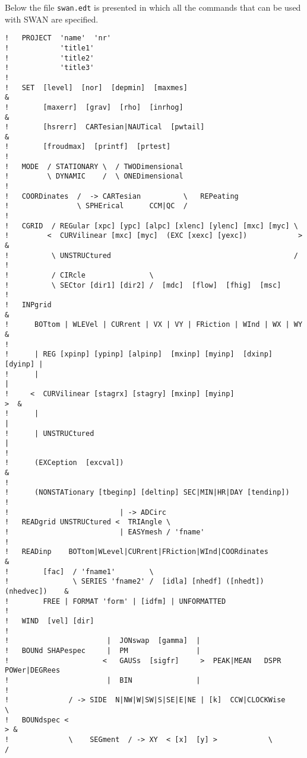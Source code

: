 \documentclass[12pt]{book}
\begin{document}
Below the file {\tt swan.edt} is presented in which all the commands that can be used with SWAN are specified.
\\[2ex]
\begin{verbatim}
!   PROJECT  'name'  'nr'
!            'title1'
!            'title2'
!            'title3'
!
!   SET  [level]  [nor]  [depmin]  [maxmes]                                 &
!        [maxerr]  [grav]  [rho]  [inrhog]                                  &
!        [hsrerr]  CARTesian|NAUTical  [pwtail]                             &
!        [froudmax]  [printf]  [prtest]
!
!   MODE  / STATIONARY \  / TWODimensional
!         \ DYNAMIC    /  \ ONEDimensional
!
!   COORDinates  /  -> CARTesian          \   REPeating
!                \ SPHErical      CCM|QC  /
!
!   CGRID  / REGular [xpc] [ypc] [alpc] [xlenc] [ylenc] [mxc] [myc] \
!         <  CURVilinear [mxc] [myc]  (EXC [xexc] [yexc])            >      &
!          \ UNSTRUCtured                                           /
!
!          / CIRcle               \
!          \ SECtor [dir1] [dir2] /  [mdc]  [flow]  [fhig]  [msc]
!
!   INPgrid                                                                 &
!      BOTtom | WLEVel | CURrent | VX | VY | FRiction | WInd | WX | WY      &
!
!      | REG [xpinp] [ypinp] [alpinp]  [mxinp] [myinp]  [dxinp] [dyinp] |
!      |                                                                |
!     <  CURVilinear [stagrx] [stagry] [mxinp] [myinp]                   >  &
!      |                                                                |
!      | UNSTRUCtured                                                   |
!
!      (EXCeption  [excval])                                                &
!
!      (NONSTATionary [tbeginp] [deltinp] SEC|MIN|HR|DAY [tendinp])
!
!                          | -> ADCirc
!   READgrid UNSTRUCtured <  TRIAngle \
!                          | EASYmesh / 'fname'
!
!   READinp    BOTtom|WLevel|CURrent|FRiction|WInd|COORdinates              &
!        [fac]  / 'fname1'        \
!               \ SERIES 'fname2' /  [idla] [nhedf] ([nhedt]) (nhedvec])    &
!        FREE | FORMAT 'form' | [idfm] | UNFORMATTED
!
!   WIND  [vel] [dir]
!
!                       |  JONswap  [gamma]  |
!   BOUNd SHAPespec     |  PM                |
!                      <   GAUSs  [sigfr]     >  PEAK|MEAN   DSPR  POWer|DEGRees
!                       |  BIN               |
!
!              / -> SIDE  N|NW|W|SW|S|SE|E|NE | [k]  CCW|CLOCKWise       \
!   BOUNdspec <                                                           > &
!              \    SEGment  / -> XY  < [x]  [y] >            \          /

\end{verbatim}
\end{document}

